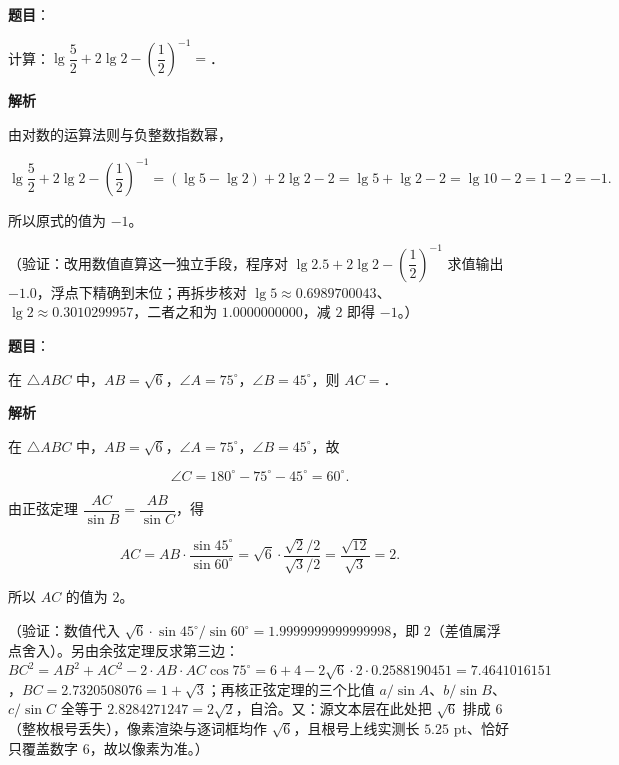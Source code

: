 \begin{answer}

\textbf{题目}：

计算：\(\lg\dfrac{5}{2}+2\lg 2-\left(\dfrac{1}{2}\right)^{-1}=\)\gkblank{}．

\textbf{解析}

由对数的运算法则与负整数指数幂，

\nopagebreak[4]
\[
\lg\dfrac{5}{2}+2\lg 2-\left(\dfrac{1}{2}\right)^{-1}=(\lg 5-\lg 2)+2\lg 2-2=\lg 5+\lg 2-2=\lg 10-2=1-2=-1.
\]

所以原式的值为 \(-1\)。

（验证：改用数值直算这一独立手段，程序对 \(\lg 2.5+2\lg 2-\left(\dfrac{1}{2}\right)^{-1}\) 求值输出 \(-1.0\)，浮点下精确到末位；再拆步核对 \(\lg 5\approx 0.6989700043\)、\(\lg 2\approx 0.3010299957\)，二者之和为 \(1.0000000000\)，减 \(2\) 即得 \(-1\)。）


\end{answer}
\begin{answer}

\textbf{题目}：

在 \(\triangle ABC\) 中，\(AB=\sqrt{6}\)，\(\angle A=75^{\circ}\)，\(\angle B=45^{\circ}\)，则 \(AC=\)\gkblank{}．

\textbf{解析}

在 \(\triangle ABC\) 中，\(AB=\sqrt{6}\)，\(\angle A=75^\circ\)，\(\angle B=45^\circ\)，故

\nopagebreak[4]
\[
\angle C=180^\circ-75^\circ-45^\circ=60^\circ.
\]

由正弦定理 \(\dfrac{AC}{\sin B}=\dfrac{AB}{\sin C}\)，得

\nopagebreak[4]
\[
AC=AB\cdot\dfrac{\sin 45^\circ}{\sin 60^\circ}=\sqrt{6}\cdot\dfrac{\sqrt{2}/2}{\sqrt{3}/2}=\dfrac{\sqrt{12}}{\sqrt{3}}=2.
\]

所以 \(AC\) 的值为 \(2\)。

（验证：数值代入 \(\sqrt{6}\cdot\sin 45^\circ/\sin 60^\circ=1.9999999999999998\)，即 \(2\)（差值属浮点舍入）。另由余弦定理反求第三边：\(BC^2=AB^2+AC^2-2\cdot AB\cdot AC\cos 75^\circ=6+4-2\sqrt{6}\cdot 2\cdot 0.2588190451=7.4641016151\)，\(BC=2.7320508076=1+\sqrt{3}\)；再核正弦定理的三个比值 \(a/\sin A\)、\(b/\sin B\)、\(c/\sin C\) 全等于 \(2.8284271247=2\sqrt{2}\)，自洽。又：源文本层在此处把 \(\sqrt{6}\) 排成 \(6\)（整枚根号丢失），像素渲染与逐词框均作 \(\sqrt{6}\)，且根号上线实测长 \(5.25\) pt、恰好只覆盖数字 \(6\)，故以像素为准。）


\end{answer}
